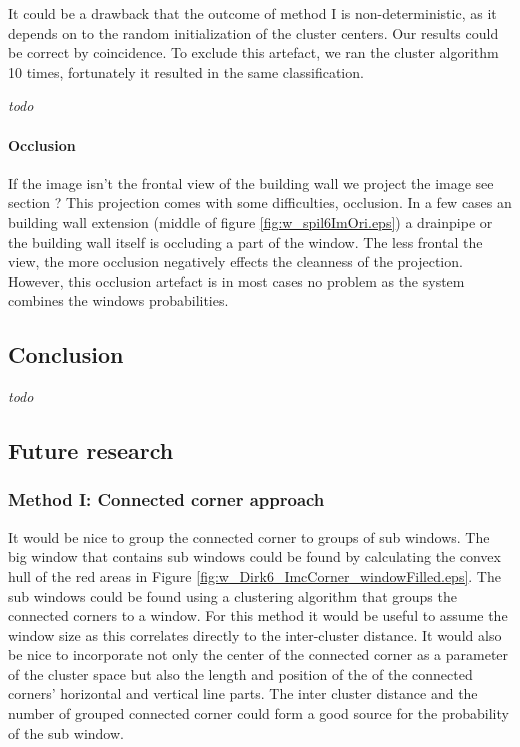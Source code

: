 


It could be a drawback that the outcome of method I is non-deterministic, as it depends on to the
random initialization of the cluster centers. Our results could be correct by
coincidence.  To exclude this artefact, we ran the cluster algorithm 10 times,
fortunately it resulted in the same classification.

\emph{todo}\\

\paragraph{Occlusion}
\label{lab:occlusion}
If the image isn't the frontal view of the building wall we project the image 
see section ?%
This projection comes with some difficulties, occlusion.  In a few cases an
building wall extension (middle of figure \ref{fig:w_spil6ImOri.eps}) a drainpipe
or the building wall itself is occluding a part of the window.  The less frontal
the view, the more occlusion negatively effects the cleanness of the projection.
However, this occlusion artefact is in most cases no problem as the system
combines the windows probabilities.  

\subsection{Conclusion}
\emph{todo}

\subsection{Future research}
\subsubsection{Method I: Connected corner approach} 
It would be nice to group the connected corner to groups of sub windows.
The big window that contains sub windows could be found by calculating the convex hull of the red areas in 
Figure \ref{fig:w_Dirk6_ImcCorner_windowFilled.eps}.
The sub windows could be found using a clustering algorithm that groups the connected corners to
a window. For this method it would be useful to assume the window size as this
correlates directly to the inter-cluster distance.
It would also be nice to incorporate not only the center of the connected corner
as a parameter of the cluster space but also the length and position of the of
the connected corners' horizontal and vertical line parts.  The inter cluster
distance and the number of grouped connected corner could form a good source for
the probability of the sub window.\\

